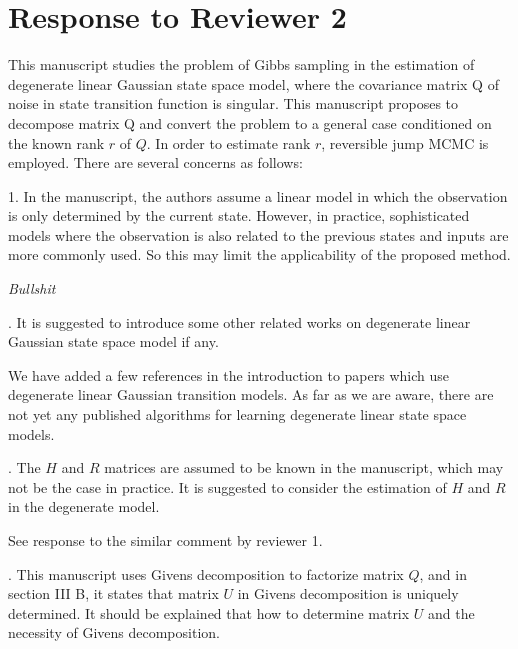 \documentclass{article}
\newenvironment{review}[0]{\begin{itshape}\color{Gray}\noindent}{\end{itshape}\vspace{0.4cm}}
\newenvironment{response}[0]{\noindent}{\vspace{0.4cm}}
\newcommand{\meta}[1]{{\color{red}\em #1}}
\begin{document}
\section*{Response to Reviewer 2}

\begin{review}
This manuscript studies the problem of Gibbs sampling in the estimation of degenerate linear Gaussian state space model, where the covariance matrix Q of noise in state transition function is singular. This manuscript proposes to decompose matrix Q and convert the problem to a general case conditioned on the known rank $r$ of $Q$. In order to estimate rank $r$, reversible jump MCMC is employed. There are several concerns as follows:

1.  In the manuscript, the authors assume a linear model in which the observation is only determined by the current state. However, in practice, sophisticated models where the observation is also related to the previous states and inputs are more commonly used. So this may limit the applicability of the proposed method.
\end{review}

\begin{response}
 \meta{Bullshit}
\end{response}

\begin{review}
2.  It is suggested to introduce some other related works on degenerate linear Gaussian state space model if any.
\end{review}

\begin{response}
 We have added a few references in the introduction to papers which use degenerate linear Gaussian transition models. As far as we are aware, there are not yet any published algorithms for learning degenerate linear state space models.
\end{response}

\begin{review}
3.  The $H$ and $R$ matrices are assumed to be known in the manuscript, which may not be the case in practice. It is suggested to consider the estimation of $H$ and $R$ in the degenerate model.
\end{review}

\begin{response}
 See response to the similar comment by reviewer 1.
\end{response}

\begin{review}
4.  This manuscript uses Givens decomposition to factorize matrix $Q$, and in section III B, it states that matrix $U$ in Givens decomposition is uniquely determined. It should be explained that how to determine matrix $U$ and the necessity of Givens decomposition.
\end{review}
\end{document}
